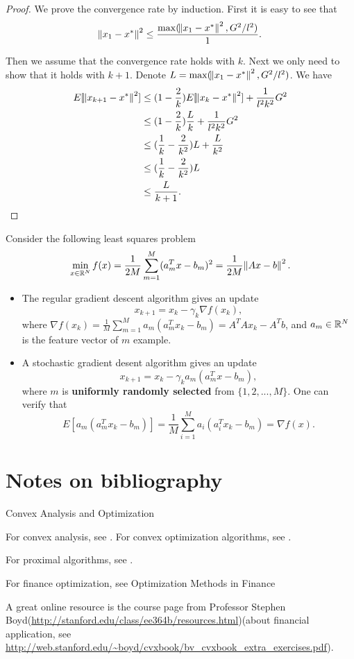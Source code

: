 \begin{refsection}
\begin{proof}
We prove the convergence rate by induction. First it is easy to see that
$$\norm{x_1 - x^*}^2 \leq \frac{\max(\norm{x_1 - x^*}^2, G^2/l^2)}{1}.$$

Then we assume that the convergence rate holds with $k$. Next we only need to show that it holds with $k+1$. Denote $L = \max(\norm{x_1 - x^*}^2, G^2/l^2)$. We have
\begin{align*}
E[\norm{x_{k+1} - x^*}^2] &\leq (1 - \frac{2}{k}) E[\norm{x_{k}-x^*}^2] + \frac{1}{l^2k^2}G^2 \\
						  &\leq  (1 - \frac{2}{k})\frac{L}{k} + \frac{1}{l^2k^2}G^2\\
						  &\leq (\frac{1}{k} - \frac{2}{k^2})L + \frac{L}{k^2} \\
						  &\leq (\frac{1}{k} - \frac{2}{k^2})L \\
							&\leq \frac{L}{k+1}.
\end{align*}

\end{proof}


\begin{example}
Consider the following least squares problem	
$$\min_{x\in \mathbb{R}^N} f(x) = \frac{1}{2M}\sum_{m=1}^M (a_m^Tx - b_m)^2 = \frac{1}{2M}\norm{Ax - b}^2.$$
\begin{itemize}
	\item The regular gradient descent algorithm gives an update 
	$$x_{k+1} = x_k - \gamma_k \nabla f(x_k),$$
where $\nabla f(x_k) = \frac{1}{M}\sum_{m=1}^M a_m(a_m^T x_k - b_m) = A^TAx_k - A^Tb$, and $a_m \in \mathbb{R}^N$ is the feature vector of $m$ example.
	\item A stochastic gradient desent algorithm gives an update
	$$x_{k+1} = x_k - \gamma_k a_m(a_m^T x - b_m),$$
	where $m$ is \textbf{uniformly randomly selected} from $\{1,2,...,M\}$. One can verify that
	$$E[a_m(a_m^T x_k - b_m)] = \frac{1}{M}\sum_{i=1}^M a_i(a_i^T x_k - b_m) = \nabla f(x).$$
\end{itemize}
\end{example}



\section{Notes on bibliography}

\cite{mordukhovich2013easy}

Convex Analysis and Optimization

For convex analysis, see \cite{bertsekas2009convex}.
For convex optimization algorithms, see \cite{bertsekas2015convex}.

For proximal algorithms, see \cite{parikh2014proximal}.

For finance optimization, see Optimization Methods in Finance


A great online  resource is the course page from Professor Stephen Boyd(\url{http://stanford.edu/class/ee364b/resources.html})(about financial application, see \url{http://web.stanford.edu/~boyd/cvxbook/bv_cvxbook_extra_exercises.pdf}). 

\printbibliography




\end{refsection}
